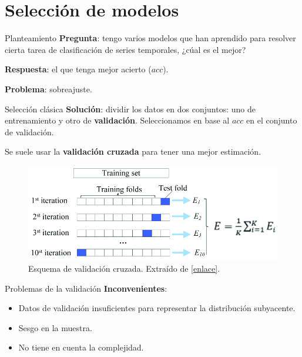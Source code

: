 \documentclass[spanish]{beamer}
\begin{document}
\section{Selección de modelos}

\begin{frame}{Planteamiento}
  \textbf{Pregunta}: tengo varios modelos que han aprendido para resolver cierta tarea de clasificación de series temporales, ¿cúal es el mejor?

  \pause

  \textbf{Respuesta}: el que tenga mejor acierto ($acc$).

  \pause

  \textbf{Problema}: sobreajuste.
\end{frame}

\begin{frame}{Selección clásica}
  \textbf{Solución}: dividir los datos en dos conjuntos: uno de entrenamiento y otro de \textbf{validación}. Seleccionamos en base al $acc$ en el conjunto de validación.

  \pause

  Se suele usar la \textbf{validación cruzada} para tener una mejor estimación.

  \begin{figure}
    \centering
    \includegraphics[width=.8 \textwidth]{img/cv}
    \caption{Esquema de validación cruzada. Extraído de \href{https://www.semanticscholar.org/paper/RFAmyloid\%3A-A-Web-Server-for-Predicting-Amyloid-Niu-Li/bf91ead8b0d49922dab952aa7f96e1480578289c/figure/6}{[enlace]}.}
  \end{figure}
\end{frame}

\begin{frame}{Problemas de la validación}
  \textbf{Inconvenientes}:
  \begin{itemize}
    \item Datos de validación insuficientes para representar la distribución subyacente.
    \item Sesgo en la muestra.
    \item No tiene en cuenta la complejidad.
  \end{itemize}
\end{frame}
\end{document}
